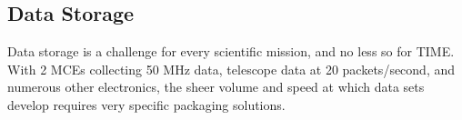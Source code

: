 \documentclass[manuscript]{aastex}
\begin{document}
\subsection{Data Storage}

Data storage is a challenge for every scientific mission, and no less so for TIME. With 2 MCEs collecting 50 MHz data, telescope data at 20 packets/second, and numerous other electronics, the sheer volume and speed at which data sets develop requires very specific packaging solutions. 

%
\end{document}
